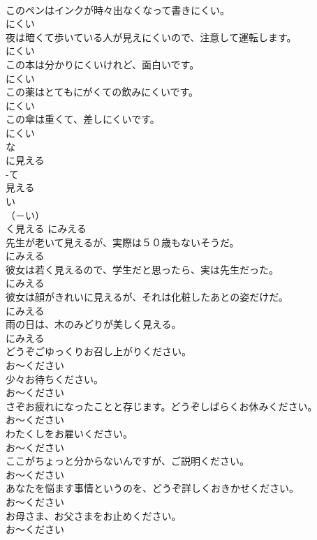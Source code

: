 \documentclass[8pt]{extreport}
\begin{document}
\begin{CJK}{UTF8}{min}
\\	このペンはインクが時々出なくなって書きにくい。	
\\	にくい
\\	夜は暗くて歩いている人が見えにくいので、注意して運転します。	
\\	にくい
\\	この本は分かりにくいけれど、面白いです。	
\\	にくい
\\	この薬はとてもにがくての飲みにくいです。	
\\	にくい
\\	この傘は重くて、差しにくいです。	
\\	にくい
\\	な
\\	に見える	
\\	-て
\\	見える	
\\	い
\\	（－い） 
\\	く見える	にみえる
\\	先生が老いて見えるが、実際は５０歳もないそうだ。	
\\	にみえる
\\	彼女は若く見えるので、学生だと思ったら、実は先生だった。	
\\	にみえる
\\	彼女は顔がきれいに見えるが、それは化粧したあとの姿だけだ。	
\\	にみえる
\\	雨の日は、木のみどりが美しく見える。	
\\	にみえる
\\	どうぞごゆっくりお召し上がりください。	
\\	お～ください
\\	少々お待ちください。	
\\	お～ください
\\	さぞお疲れになったことと存じます。どうぞしばらくお休みください。	
\\	お～ください
\\	わたくしをお雇いください。	
\\	お～ください
\\	ここがちょっと分からないんですが、ご説明ください。	
\\	お～ください
\\	あなたを悩ます事情というのを、どうぞ詳しくおきかせください。	
\\	お～ください
\\	お母さま、お父さまをお止めください。	
\\	お～ください

\end{CJK}
\end{document}
